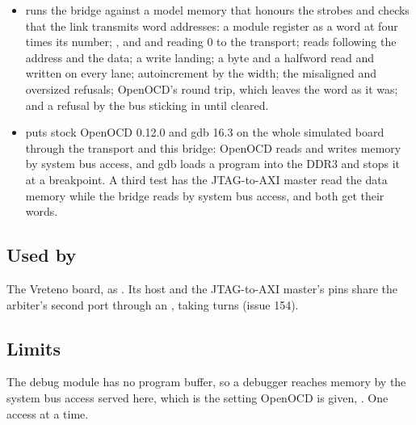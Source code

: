 \begin{itemize}
\item {} runs the bridge against a model
memory that honours the strobes and checks that the link transmits word
addresses: a module register as a word at four times its number;
, and  and  reading 0 to the
transport; reads following the address and the data; a write
landing; a byte and a halfword read and written on every lane;
autoincrement by the width; the misaligned and oversized refusals;
OpenOCD's  round trip, which leaves the word as it was;
and a refusal by the bus sticking in  until cleared.
\item {} puts stock OpenOCD 0.12.0 and
gdb 16.3 on the whole simulated board through the transport and this
bridge: OpenOCD reads and writes memory by system bus access, and
gdb loads a program into the DDR3 and stops it at a breakpoint. A
third test has the JTAG-to-AXI master read the data memory while the
bridge reads by system bus access, and both get their words.
\end{itemize}

\subsection*{Used by}

The Vreteno board, as . Its host and
the JTAG-to-AXI master's pins share the arbiter's second port through
an , taking turns (issue 154).

\subsection*{Limits}

The debug module has no program buffer, so a debugger reaches memory
by the system bus access served here, which is the setting OpenOCD is
given, . One access at a time.
